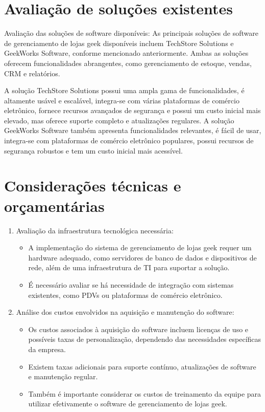 \documentclass[
	12pt,				%
	openright,			%
	twoside,			%
	a4paper,			%
	english,			%
	brazil				%
	]{abntex2}
\begin{document}
\section{Avaliação de soluções existentes}\label{solu_existentes}

Avaliação das soluções de software disponíveis: As principais soluções de software de gerenciamento de lojas geek disponíveis incluem TechStore Solutions e GeekWorks Software, conforme mencionado anteriormente. Ambas as soluções oferecem funcionalidades abrangentes, como gerenciamento de estoque, vendas, CRM e relatórios.

A solução TechStore Solutions possui uma ampla gama de funcionalidades, é altamente usável e escalável, integra-se com várias plataformas de comércio eletrônico, fornece recursos avançados de segurança e possui um custo inicial mais elevado, mas oferece suporte completo e atualizações regulares. A solução GeekWorks Software também apresenta funcionalidades relevantes, é fácil de usar, integra-se com plataformas de comércio eletrônico populares, possui recursos de segurança robustos e tem um custo inicial mais acessível.

\section{Considerações técnicas e orçamentárias}\label{tec_e_orc}

\begin{enumerate}
	\item Avaliação da infraestrutura tecnológica necessária:
		\begin{itemize}
		\item	A implementação do sistema de gerenciamento de lojas geek requer um hardware adequado, como servidores de banco de dados e dispositivos de rede, além de uma infraestrutura de TI para suportar a solução.
		\item	É necessário avaliar se há necessidade de integração com sistemas existentes, como PDVs ou plataformas de comércio eletrônico.
		\end{itemize}

	\item Análise dos custos envolvidos na aquisição e manutenção do software:
		\begin{itemize}
		\item	Os custos associados à aquisição do software incluem licenças de uso e possíveis taxas de personalização, dependendo das necessidades específicas da empresa.
		\item	Existem taxas adicionais para suporte contínuo, atualizações de software e manutenção regular.
		\item	Também é importante considerar os custos de treinamento da equipe para utilizar efetivamente o software de gerenciamento de lojas geek.
		\end{itemize}
\end{enumerate}
\end{document}
